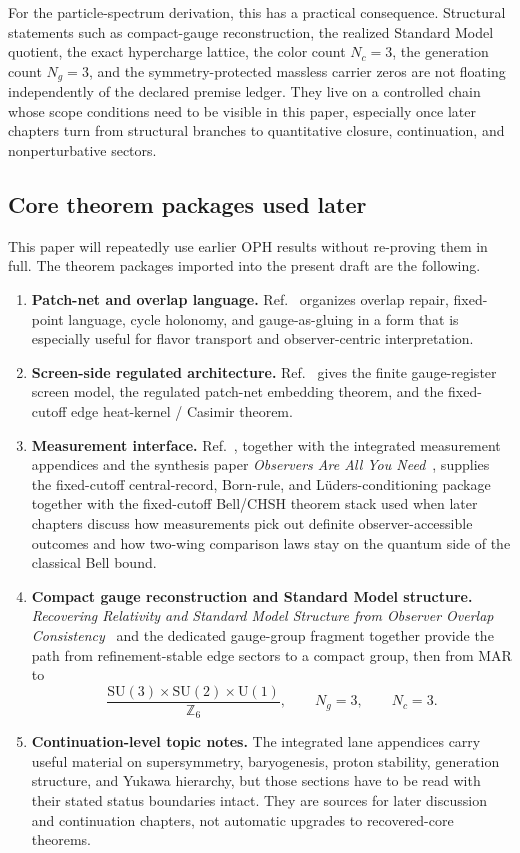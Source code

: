 \documentclass[11pt]{article}
\newcommand{\SU}{\mathrm{SU}}
\newcommand{\U}{\mathrm{U}}
\begin{document}
For the particle-spectrum derivation, this has a practical consequence. Structural statements such
as compact-gauge reconstruction, the realized Standard Model quotient, the exact hypercharge
lattice, the color count \(N_c=3\), the generation count \(N_g=3\), and the symmetry-protected
massless carrier zeros are not floating independently of the declared premise ledger. They live on a
controlled chain whose scope conditions need to be visible in this paper,
especially once later chapters turn from structural branches to quantitative closure, continuation, and
nonperturbative sectors.

\subsection{Core theorem packages used later}

This paper will repeatedly use earlier OPH results without re-proving them in full. The
theorem packages imported into the present draft are the following.

\begin{enumerate}[leftmargin=2em]
\item \textbf{Patch-net and overlap language.} Ref.~\cite{ophconsensus} organizes overlap repair,
fixed-point language, cycle holonomy, and gauge-as-gluing in a form that is especially useful
for flavor transport and observer-centric interpretation.
\item \textbf{Screen-side regulated architecture.} Ref.~\cite{ophmicrophysics} gives the
finite gauge-register screen model, the regulated patch-net embedding theorem, and the fixed-cutoff
edge heat-kernel / Casimir theorem.
\item \textbf{Measurement interface.} Ref.~\cite{ophmicrophysics}, together with the integrated
measurement appendices and the synthesis paper \emph{Observers Are All You Need}~\cite{ophsynthesis}, supplies the fixed-cutoff central-record, Born-rule, and
L\"uders-conditioning package together with the fixed-cutoff Bell/CHSH theorem stack used when
later chapters discuss how measurements pick out definite observer-accessible outcomes and how
two-wing comparison laws stay on the quantum side of the classical Bell bound.
\item \textbf{Compact gauge reconstruction and Standard Model structure.}
\emph{Recovering Relativity and Standard Model Structure from Observer Overlap Consistency}~\cite{ophcompact}
and the dedicated gauge-group fragment together provide the path from refinement-stable
edge sectors to a compact group, then from MAR to
\[
\frac{\SU(3)\times\SU(2)\times\U(1)}{\mathbb Z_6},
\qquad
N_g=3,
\qquad
N_c=3.
\]
\item \textbf{Continuation-level topic notes.} The integrated lane appendices carry useful material
on supersymmetry, baryogenesis, proton stability, generation structure, and Yukawa hierarchy,
but those sections have to be read with their stated status boundaries intact. They are sources
for later discussion and continuation chapters, not automatic upgrades to recovered-core theorems.
\end{enumerate}
\end{document}
